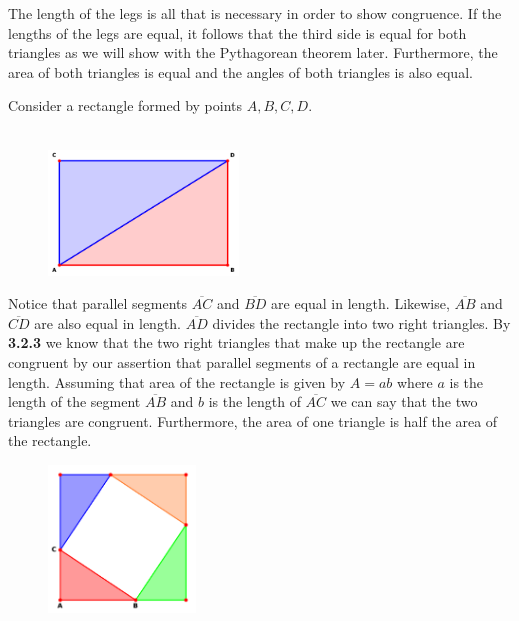 \documentclass[12pt]{report}
\begin{document}
The length of the legs is all that is necessary in order to show congruence. If the lengths of the legs are equal, it follows that the third side is equal for both triangles as we will show with the Pythagorean theorem later. Furthermore, the area of both triangles is equal and the angles of both triangles is also equal.\medskip


Consider a rectangle formed by points $A,B,C,D$.
\bigskip\\
\bigskip\\
\begin{figure}[h]
    \centering
    \includegraphics[width=0.45\textwidth]{rect.pdf}
\end{figure}

Notice that parallel segments $\overline{AC}$ and $\overline{BD}$ are equal in length. Likewise, $\overline{AB}$ and $\overline{CD}$ are also equal in length. $\overline{AD}$ divides the rectangle into two right triangles. By \textbf{3.2.3} we know that the two right triangles that make up the rectangle are congruent by our assertion that parallel segments of a rectangle are equal in length. Assuming that area of the rectangle is given by $A=ab$ where $a$ is the length of the segment $\overline{AB}$ and $b$ is the length of $\overline{AC}$ we can say that the two triangles are congruent. Furthermore, the area of one triangle is half the area of the rectangle.


\begin{figure}[h]
    \centering
    \includegraphics[width=0.35\textwidth]{pythagorean.pdf}
\end{figure}
\end{document}

